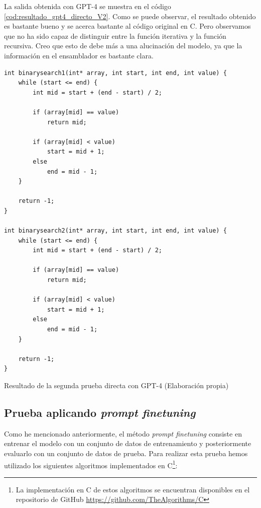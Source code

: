 La salida obtenida con GPT-4 se muestra en el código \ref{cod:resultado_gpt4_directo_V2}.
Como se puede observar, el resultado obtenido es bastante bueno y se acerca bastante al
código original en C. Pero observamos que no ha sido capaz de distinguir entre la función
iterativa y la función recursiva. Creo que esto de debe más a una alucinación del modelo,
ya que la información en el ensamblador es bastante clara.

\begin{mycode}
    \begin{verbatim}
int binarysearch1(int* array, int start, int end, int value) {
    while (start <= end) {
        int mid = start + (end - start) / 2;

        if (array[mid] == value)
            return mid;

        if (array[mid] < value)
            start = mid + 1;
        else
            end = mid - 1;
    }

    return -1;
}

int binarysearch2(int* array, int start, int end, int value) {
    while (start <= end) {
        int mid = start + (end - start) / 2;

        if (array[mid] == value)
            return mid;

        if (array[mid] < value)
            start = mid + 1;
        else
            end = mid - 1;
    }

    return -1;
}       
    \end{verbatim}
    \caption[Resultado de la segunda prueba directa con GPT-4]{Resultado de la segunda prueba directa con GPT-4 (Elaboración propia)}
    \label{cod:resultado_gpt4_directo_V2}
\end{mycode}

\subsection{Prueba aplicando \textit{prompt finetuning}}
\label{subsec:prueba_prompt_finetuning}


Como he mencionado anteriormente, el método \textit{prompt finetuning} consiste en entrenar
el modelo con un conjunto de datos de entrenamiento y posteriormente evaluarlo con un conjunto
de datos de prueba. Para realizar esta prueba hemos utilizado los siguientes algoritmos implementados
en C\footnote{La implementación en C de estos algoritmos se encuentran disponibles en el repositorio de GitHub
\url{https://github.com/TheAlgorithms/C}}:

